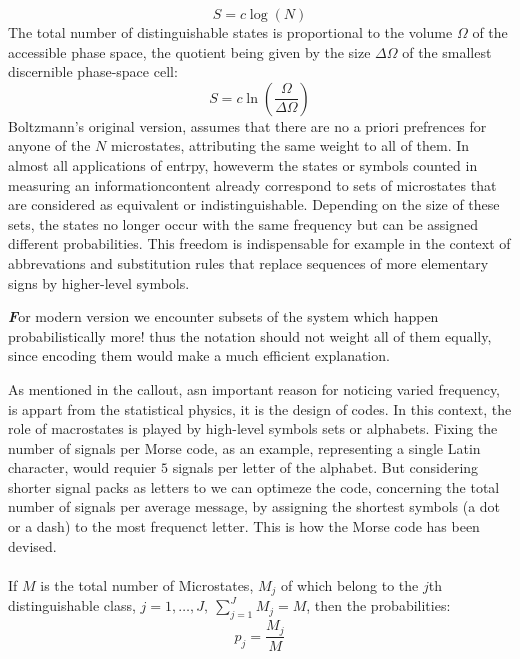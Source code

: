 \documentclass[9pt,a4paper, twocolumn]{article}
\newenvironment{callout}
	{\begin{calloutbox}\color{charcoal}\textbf\textit}
	{\end{calloutbox}}
\begin{document}
            \begin{equation}
                S = c\log(N)
            \end{equation}
            The total number of distinguishable states is proportional to the volume $\Omega$ of the accessible phase space, the quotient being given by the size $\Delta \Omega$ of the smallest discernible phase-space cell:
            \begin{equation}
                S = c \ln(\frac{\Omega}{\Delta\Omega})
            \end{equation}
            Boltzmann's original version, assumes that there are no a priori prefrences for anyone of the $N$ microstates, attributing the same weight to all of them. In almost all applications of entrpy, howeverm the states or symbols counted in measuring an informationcontent already correspond to sets of microstates that are considered as equivalent or indistinguishable. Depending on the size of these sets, the states no longer occur with the same frequency but can be assigned different probabilities. This freedom is indispensable for example in the context of abbrevations and substitution rules that replace sequences of more elementary signs by higher-level symbols.
            \begin{callout}
                For modern version we encounter subsets of the system which happen probabilistically more! thus the notation should not weight all of them equally, since encoding them would make a much efficient explanation.
            \end{callout}
            As mentioned in the callout, asn important reason for noticing varied frequency, is appart from the statistical physics, it is the design of codes. In this context, the role of macrostates is played by high-level symbols sets or alphabets. Fixing the number of signals per Morse code, as an example, representing a single Latin character, would requier $5$ signals per letter of the alphabet. But considering shorter signal packs as letters to we can optimeze the code, concerning the total number of signals per average message, by assigning the shortest symbols (a dot or a dash) to the most frequenct letter. This is how the Morse code has been devised.
            \\
            \\
            If $M$ is the total number of Microstates, $M_j$ of which belong to the $j$th distinguishable class, $j = 1,\dots, J,  \ \sum_{j=1}^{J} M_j = M$, then the probabilities:
            \begin{equation}
                p_j = \frac{M_j}{M}
            \end{equation}
\end{document}
